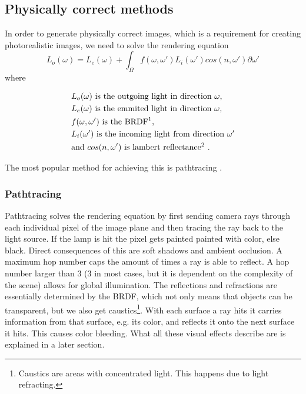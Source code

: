 \documentclass{ACGSeminar}
\begin{document}
	\subsection{Physically correct methods}
	In order to generate physically correct images, which is a requirement for creating photorealistic images, we need to solve the rendering equation
	$$ L_o(\omega) = L_e(\omega) + \int_\Omega f(\omega, \omega')L_i(\omega')cos(n, \omega') \partial \omega' $$
	where 
	\begin{center}
		\begin{align*}
			&L_o(\omega) \text{ is the outgoing light in direction } \omega\text{,}\\
			&L_e(\omega) \text{ is the emmited light in direction } \omega\text{,}\\
			&f(\omega, \omega') \text{ is the BRDF\footnotemark} \text{,}\\
			&L_i(\omega') \text{ is the incoming light from direction } \omega'\\
			&\text{and } cos(n, \omega') \text{ is lambert reflectance\footnotemark}  \text{ .}
		\end{align*}
	\end{center}
	\addtocounter{footnote}{-1}
	The most popular method for achieving this is pathtracing \cite{P2PATH}.
	\subsubsection{Pathtracing}
		Pathtracing solves the rendering equation by first sending camera rays through each individual pixel of the image plane and then tracing the ray back to the light source. If the lamp is hit the pixel gets painted painted with color, else black. Direct consequences of this are soft shadows and ambient occlusion. A maximum hop number caps the amount of times a ray is able to reflect. A hop number larger than 3 (3 in most cases, but it is dependent on the complexity of the scene) allows for global illumination. The reflections and refractions are essentially determined by the BRDF, which not only means that objects can be transparent, but we also get caustics\footnote{Caustics are areas with concentrated light. This happens due to light refracting.}. With each surface a ray hits it carries information from that surface, e.g. its color, and reflects it onto the next surface it hits. This causes color bleeding. What all these visual effects describe are is explained in a later section. %
\end{document}
